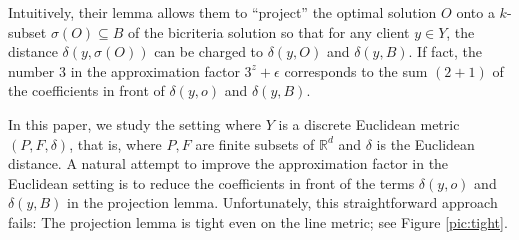\documentclass[11pt]{article}
\newcommand{\bRd}{\ensuremath{\mathbb{R}^d}\xspace}
\begin{document}
Intuitively, their lemma allows them to ``project'' the optimal solution $O$ onto a $k$-subset $\sigma(O) \subseteq B$ of the bicriteria solution so that for any client $y\in Y$, the distance $\delta(y,\sigma(O))$ can be charged to $\delta(y,O)$ and $\delta(y,B)$. If fact, the  number $3$ in the approximation factor $3^z+\epsilon$ corresponds to the sum $(2+1)$ of the coefficients in front of $\delta(y,o)$ and $\delta(y,B)$.


In this paper, we study the setting where $Y$ is a discrete Euclidean metric $(P,F,\delta)$, that is, where $P,F$ are finite subsets of $\bRd$ and $\delta$ is the Euclidean distance. A natural attempt to improve the approximation factor in the Euclidean setting is to reduce the coefficients in front of the terms $\delta(y,o)$ and $\delta(y,B)$ in the projection lemma. Unfortunately, this straightforward approach fails: The projection lemma is tight even on the line metric; see Figure \ref{pic:tight}.
\end{document}
